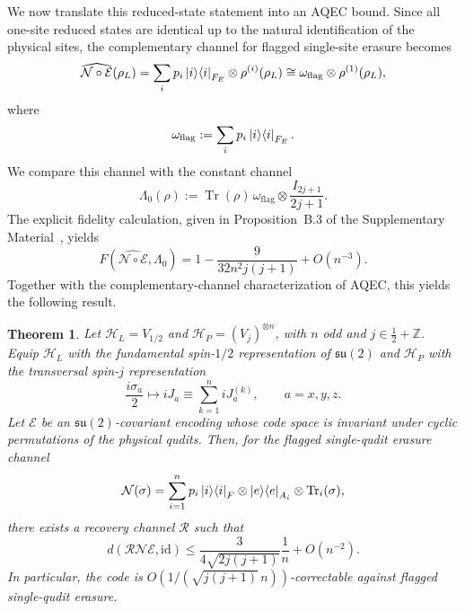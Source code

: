 \documentclass[10pt,twocolumn,superscriptaddress,aps,amsmath,amssymb,citeautoscript,floatfix,prx,longbibliography]{revtex4-2}
\newtheorem{theorem}{Theorem}
\theoremstyle{plain}
\theoremstyle{plain}
\theoremstyle{plain}
\theoremstyle{plain}
\theoremstyle{plain}
\theoremstyle{plain}
\begin{document}
We now translate this reduced-state statement into an AQEC bound. Since all one-site reduced states are identical up to the natural identification of the physical sites, the complementary channel for flagged single-site erasure becomes
\begin{equation}\label{eq:comp_chan_su2}
    \widehat{\mathcal N\circ\mathcal E}(\rho_L)
    =
    \sum_i p_i\ket i\!\bra i_{F_E}\otimes \rho^{(i)}(\rho_L)
    \cong
    \omega_{\mathrm{flag}}\otimes \rho^{(1)}(\rho_L),
\end{equation}
where
\[
    \omega_{\mathrm{flag}}
    :=
    \sum_i p_i\ket i\!\bra i_{F_E} .
\]
We compare this channel with the constant channel
\[
    \Lambda_0(\rho)
    :=
    \operatorname{Tr}(\rho)\,
    \omega_{\mathrm{flag}}\otimes \frac{I_{2j+1}}{2j+1} .
\]
The explicit fidelity calculation, given in Proposition~B.3 of the Supplementary Material~\cite{SuppMat}, yields
\begin{equation}\label{eq:fidelity_su2}
    F\!\left(\widehat{\mathcal N\circ\mathcal E},\Lambda_0\right)
    =
    1-
    \frac{9}{32n^2j(j+1)}
    +O(n^{-3}) .
\end{equation}
Together with the complementary-channel characterization of AQEC, this yields the following result.

\begin{theorem}\label{thrm:su2scale}
Let $\mathcal H_L=V_{1/2}$ and $\mathcal H_P=(V_j)^{\otimes n}$, with $n$ odd and $j\in\frac12+\mathbb Z$. Equip $\mathcal H_L$ with the fundamental spin-$1/2$ representation of $\mathfrak{su}(2)$ and $\mathcal H_P$ with the transversal spin-$j$ representation
\begin{equation}
    \frac{i\sigma_a}{2}
    \longmapsto
    iJ_a
    \equiv
    \sum_{k=1}^n iJ_a^{(k)},
    \qquad a=x,y,z .
\end{equation}
Let $\mathcal E$ be an $\mathfrak{su}(2)$-covariant encoding whose code space is invariant under cyclic permutations of the physical qudits. Then, for the flagged single-qudit erasure channel
\[
    \mathcal N(\sigma)
    =
    \sum_{i=1}^n p_i\ket i\!\bra i_F
    \otimes \ket e\!\bra e_{A_i}
    \otimes \operatorname{Tr}_i(\sigma),
\]
there exists a recovery channel $\mathcal R$ such that
\[
    d(\mathcal R\mathcal N\mathcal E,\mathrm{id})
    \le
    \frac{3}{4\sqrt{2j(j+1)}}\frac{1}{n}
    +O(n^{-2}) .
\]
In particular, the code is $O\!\left(1/(\sqrt{j(j+1)}\,n)\right)$-correctable against flagged single-qudit erasure.
\end{theorem}
\end{document}
